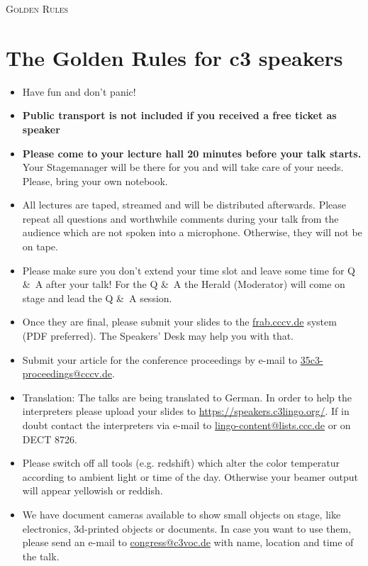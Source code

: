 \documentclass[paper=a4]{scrartcl}
\begin{document}
	\begin{center} \textsc{\Huge Golden Rules}\end{center}
	\hfill
	\section*{The Golden Rules for c3 speakers}
	\begin{itemize}
		\item Have fun and don't panic!
		\item \textbf{Public transport is not included if you received a free ticket as speaker}
		\item \textbf{Please come to your lecture hall 20 minutes before your talk starts.} Your
		Stagemanager will be there	for	you and will take care of your needs. Please, bring your own notebook.
		\item All lectures are taped, streamed and will be distributed afterwards. Please repeat all questions and worthwhile comments during your talk from the audience which are not spoken into a microphone. Otherwise, they will not be on tape.
		\item Please make sure you don't extend your time slot and
		leave some time for Q \&\ A after your talk! For the Q \&\ A  the Herald (Moderator) will come on stage and lead the Q \&\ A session. 
		\item Once they are final, please submit your slides to the \url{frab.cccv.de} system (PDF preferred). The Speakers' Desk may help you with that.
		\item Submit your article for the conference proceedings by e-mail to \url{35c3-proceedings@cccv.de}.
		\item Translation: The talks are being translated to German. In order to help the interpreters please upload your slides to \url{https://speakers.c3lingo.org/}. If in doubt contact the interpreters via e-mail  to \url{lingo-content@lists.ccc.de} or on DECT 8726.
		\item Please switch off all tools (e.g. redshift) which alter the color temperatur according to ambient light or time of the day. Otherwise your beamer output will appear yellowish or reddish.
		\item We have document cameras available to show small objects on stage, like electronics, 3d-printed objects or documents. In case you want to use them, please send an e-mail to \url{congress@c3voc.de} with name, location and time of the talk.
	\end{itemize}
\end{document}
